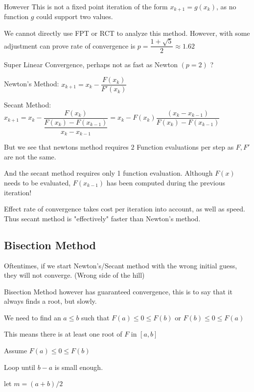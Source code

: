 \documentclass{article}
\begin{document}
\vspace{0.2cm}

However This is not a fixed point iteration of the form $x_{k + 1} = g(x_k)$, as no function $g$ could support two values.

We cannot directly use  FPT or RCT to analyze this method. However, with some adjustment can prove rate of convergence is $p = \dfrac{1 + \sqrt{5}}{2} \approx 1.62$

\vspace{0.2cm}

Super Linear Convergence, perhaps not as fast as Newton $(p = 2)$ ?

Newton's Method: $x_{k + 1} = x_k - \dfrac{F(x_k)}{F'(x_k)}$

Secant Method: $x_{k + 1} = x_k - \dfrac{F(x_k)}{ \dfrac{F(x_k) - F(x_{k - 1})}{x_k - x_{k - 1}} } = x_k - F(x_k) \dfrac{(x_k - x_{k - 1})}{F(x_k) - F(x_{k - 1})}$


But we see that newtons method requires $2$ Function evaluations per step as $F, F'$ are not the same.

And the secant method requires only 1 function evaluation. Although $F(x)$ needs to be evaluated, $F(x_{k - 1})$ has been computed during the previous iteration!

Effect rate of convergence takes cost per iteration into account, as well as speed. Thus secant method is "effectively" faster than Newton's method.

\subsection{Bisection Method}

Oftentimes, if we start Newton's/Secant method with the wrong initial guess, they will not converge. (Wrong side of the hill)

Bisection Method however has guaranteed convergence, this is to say that it always finds a root, but slowly.

We need to find an $a \leq b$ such that $F(a) \leq 0 \leq F(b)$ or $F(b) \leq 0 \leq F(a)$

This means there is at least one root of $F$ in $[a, b]$ 

\vspace{0.2cm}

Assume $F(a) \leq 0 \leq F(b)$

\hspace{1cm} Loop until $b - a$ is small enough.

\hspace{1cm} let $m = (a + b)/2$
\end{document}
